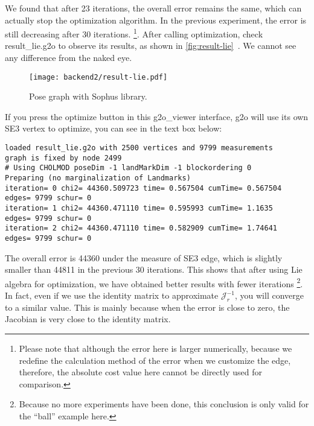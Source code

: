 We found that after 23 iterations, the overall error remains the same, which can actually stop the optimization algorithm. In the previous experiment, the error is still decreasing after 30 iterations. \footnote{Please note that although the error here is larger numerically, because we redefine the calculation method of the error when we customize the edge, therefore, the absolute cost value here cannot be directly used for comparison. }. After calling optimization, check result\_lie.g2o to observe its results, as shown in \autoref{fig:result-lie}~. We cannot see any difference from the naked eye.

\begin{figure}[!ht]
	\centering
	\texttt{[image: backend2/result-lie.pdf]}
	\caption{Pose graph with Sophus library.}
	\label{fig:result-lie}
\end{figure}

If you press the optimize button in this g2o\_viewer interface, g2o will use its own SE3 vertex to optimize, you can see in the text box below:
\begin{lstlisting}
loaded result_lie.g2o with 2500 vertices and 9799 measurements
graph is fixed by node 2499
# Using CHOLMOD poseDim -1 landMarkDim -1 blockordering 0
Preparing (no marginalization of Landmarks)
iteration= 0 chi2= 44360.509723 time= 0.567504 cumTime= 0.567504 edges= 9799 schur= 0
iteration= 1 chi2= 44360.471110 time= 0.595993 cumTime= 1.1635   edges= 9799 schur= 0
iteration= 2 chi2= 44360.471110 time= 0.582909 cumTime= 1.74641  edges= 9799 schur= 0
\end{lstlisting}

The overall error is 44360 under the measure of SE3 edge, which is slightly smaller than 44811 in the previous 30 iterations. This shows that after using Lie algebra for optimization, we have obtained better results with fewer iterations \footnote{Because no more experiments have been done, this conclusion is only valid for the ``ball'' example here.}. In fact, even if we use the identity matrix to approximate $\bm{\mathcal{J}}_r^{-1}$, you will converge to a similar value. This is mainly because when the error is close to zero, the Jacobian is very close to the identity matrix.

